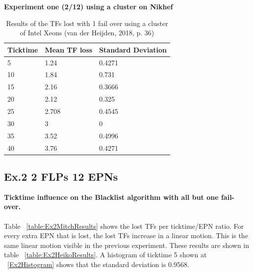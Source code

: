 \begin{table}[h!]
\caption*{\textbf{Experiment one (2/12) using a cluster on Nikhef}}
\begin{tabular}{| l | l | l |}
\hline
Ticktime & Mean TF loss & Standard Deviation \\ \hline
5 & 1.24 & 0.4271 \\ \hline
10 & 1.84 & 0.731 \\ \hline
15 & 2.16 & 0.3666 \\ \hline
20 & 2.12 & 0.325 \\ \hline
25 & 2.708 & 0.4545 \\ \hline
30 & 3 & 0 \\ \hline
35 & 3.52 & 0.4996 \\ \hline
40 & 3.76 & 0.4271 \\ \hline
\end{tabular}
\caption{Results of the TFs lost with 1 fail over using a cluster of Intel Xeons (van der Heijden, 2018, p. 36)}
\label{table:Ex1HeikoResults}
\end{table}

\subsection*{Ex.2 2 FLPs 12 EPNs}
\textbf{Ticktime influence on the Blacklist algorithm with all but one fail-over.}
\\~\\
Table ~\ref{table:Ex2MitchResults} shows the lost TFs per ticktime/EPN ratio. For every extra EPN that is lost, the lost TFs increase in a linear motion. This is the same linear motion visible in the previous experiment. These results are shown in table ~\ref{table:Ex2HeikoResults}. A histogram of ticktime 5 shown at ~\ref{Ex2Histogram} shows that the standard deviation is 0.9568.

